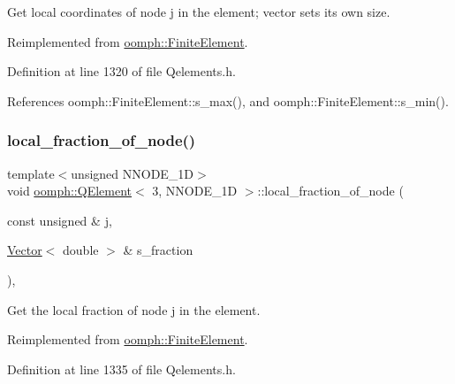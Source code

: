 Get local coordinates of node j in the element; vector sets its own size. 



Reimplemented from \hyperlink{classoomph_1_1FiniteElement_a22bc4ee35e4f948d8d7fba18c7b4f4c4}{oomph\+::\+Finite\+Element}.



Definition at line 1320 of file Qelements.\+h.



References oomph\+::\+Finite\+Element\+::s\+\_\+max(), and oomph\+::\+Finite\+Element\+::s\+\_\+min().

\mbox{\label{classoomph_1_1QElement_3_013_00_01NNODE__1D_01_4_a702b787cd3fbb7b1b2d9054860f2d9c0}} 
\subsubsection{\texorpdfstring{local\+\_\+fraction\+\_\+of\+\_\+node()}{local\_fraction\_of\_node()}}
{\footnotesize\ttfamily template$<$unsigned N\+N\+O\+D\+E\+\_\+1D$>$ \\
void \hyperlink{classoomph_1_1QElement}{oomph\+::\+Q\+Element}$<$ 3, N\+N\+O\+D\+E\+\_\+1D $>$\+::local\+\_\+fraction\+\_\+of\+\_\+node (\begin{DoxyParamCaption}\item[{const unsigned \&}]{j,  }\item[{\hyperlink{classoomph_1_1Vector}{Vector}$<$ double $>$ \&}]{s\+\_\+fraction }\end{DoxyParamCaption})\hspace{0.3cm}{\ttfamily [inline]}, {\ttfamily [virtual]}}



Get the local fraction of node j in the element. 



Reimplemented from \hyperlink{classoomph_1_1FiniteElement_a41640b9a9e5f6461cd8ebb8218502b07}{oomph\+::\+Finite\+Element}.



Definition at line 1335 of file Qelements.\+h.

